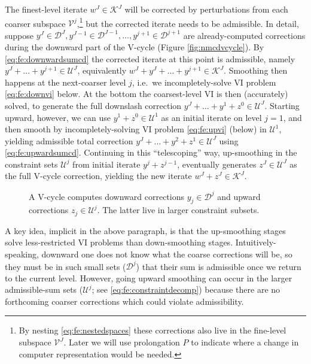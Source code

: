 \documentclass[letterpaper,final,12pt,reqno]{amsart}
\theoremstyle{cstyle}
\theoremstyle{cstyle*}
\theoremstyle{dstyle}
\numberwithin{equation}{section}
\numberwithin{figure}{section}
\numberwithin{table}{section}
\numberwithin{theorem}{section}
\begin{document}
The finest-level iterate $w^J \in \mathcal{K}^J$ will be corrected by perturbations from each coarser subspace $\mathcal{V}^j$,\footnote{By nesting \eqref{eq:fe:nestedspaces} these corrections also live in the fine-level subspace $\mathcal{V}^J$.  Later we will use prolongation $P$ to indicate where a change in computer representation would be needed.} but the corrected iterate needs to be admissible.  In detail, suppose $y^J \in \mathcal{D}^J, y^{J-1} \in \mathcal{D}^{J-1}, \dots, y^{j+1} \in \mathcal{D}^{j+1}$ are already-computed corrections during the downward part of the V-cycle (Figure \ref{fig:nmcdvcycle}).  By \eqref{eq:fe:downwardsumcd} the corrected iterate at this point is admissible, namely $y^J + \dots + y^{j+1} \in \mathcal{U}^J$, equivalently $w^J + y^J + \dots + y^{j+1} \in \mathcal{K}^J$.  Smoothing then happens at the next-coarser level $j$, i.e.~we incompletely-solve VI problem \eqref{eq:fe:downvi} below.  At the bottom the coarsest-level VI is then (accurately) solved, to generate the full downslash correction $y^J + \dots + y^1 + z^0 \in \mathcal{U}^J$.  Starting upward, however, we can use $y^1+ z^0 \in \mathcal{U}^1$ as an initial iterate on level $j=1$, and then smooth by incompletely-solving VI problem \eqref{eq:fe:upvi} (below) in $\mathcal{U}^1$, yielding admissible total correction $y^J + \dots + y^2 + z^1 \in \mathcal{U}^J$ using \eqref{eq:fe:upwardsumcd}.  Continuing in this ``telescoping'' way, up-smoothing in the constraint sets $\mathcal{U}^j$ from initial iterate $y^j+z^{j-1}$, eventually generates $z^J\in \mathcal{U}^J$ as the full V-cycle correction, yielding the new iterate $w^J + z^J \in \mathcal{K}^J$.

\begin{figure}[ht]
\begin{center}

\end{center}
\caption{A \fascd V-cycle computes downward corrections $y_j \in \mathcal{D}^j$ and upward corrections $z_j\in\mathcal{U}^j$.  The latter live in larger constraint subsets.}
\label{fig:fascdvcycle}
\end{figure}

A key idea, implicit in the above paragraph, is that the up-smoothing stages solve less-restricted VI problems than down-smoothing stages.  Intuitively-speaking, downward one does not know what the coarse corrections will be, so they must be in such small sets ($\mathcal{D}^j$) that their sum is admissible once we return to the current level.  However, going upward smoothing can occur in the larger admissible-sum sets ($\mathcal{U}^j$; see \eqref{eq:fe:constraintdecomp}) because there are no forthcoming coarser corrections which could violate admissibility.
\end{document}
